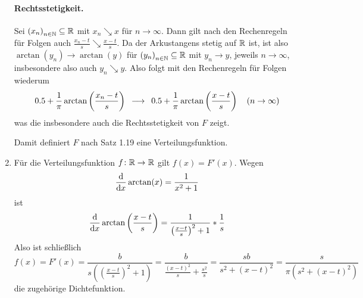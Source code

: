 \begin{exercisePage}
\begin{enumerate}[leftmargin=*, label=(\alph*)]
        \paragraph{Rechtsstetigkeit.} Sei $\folge{x_n} \subseteq \R$ mit $x_n \searrow x$ für $n \to \infty$. Dann gilt nach den Rechenregeln für Folgen auch $\frac{x_n - t}{s} \searrow \frac{x - t}{s}$. Da der Arkustangens stetig auf $\mathbb{R}$ ist, ist also $\arctan(y_n) \to \arctan(y)$ für $\folge{y_n} \subseteq \R$ mit $y_n \to y$, jeweils $n \to \infty$, insbesondere also auch $y_n \searrow y$. Also folgt mit den Rechenregeln für Folgen wiederum
        \begin{equation*}
        0.5 + \frac{1}{\pi} \arctan \left( \frac{x_n-t}{s} \right) \enskip \longrightarrow \enskip 0.5 + \frac{1}{\pi} \arctan \left( \frac{x-t}{s} \right) \quad (n \to \infty)
        \end{equation*}
        was die insbesondere auch die Rechtsstetigkeit von $F$ zeigt. 
        
        Damit definiert $F$ nach Satz 1.19 eine Verteilungsfunktion.
        \item Für die Verteilungsfunktion $\abb{f}{\R}{\R}$ gilt $f(x) = F'(x)$. Wegen
        \begin{equation*}
            \frac{\mathrm{d}}{\mathrm{d} x } \arctan(x) = \frac{1}{x^2 + 1}
        \end{equation*}
        ist
        \begin{equation*}
            \frac{\mathrm{d}}{\mathrm{d} x } \arctan\left(\frac{x-t}{s}\right) = \frac{1}{\left(\frac{x-t}{s}\right)^2 + 1} * \frac{1}{s}
        \end{equation*}
        Also ist schließlich
        \begin{equation*}
            f(x) = F'(x) = \frac{b}{s \left( \left( \frac{x-t}{s} \right)^2 + 1 \right)}
            = \frac{b}{\frac{(x-t)^2}{s} + \frac{s^2}{s}} 
            = \frac{sb}{s^2 + (x-t)^2} 
            = \frac{s}{\pi \left( s^2 + (x-t)^2 \right)}
        \end{equation*}
        die zugehörige Dichtefunktion.
    \end{enumerate}



\end{exercisePage}
